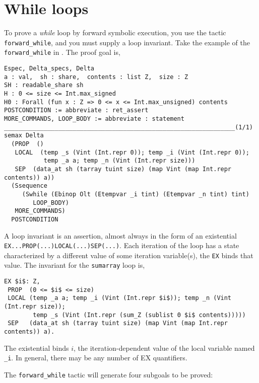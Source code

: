 \documentclass[12pt,fleqn,openany,oneside,showtrims]{memoir}
\begin{document}
\chapter{While loops}
\label{refcard:forward-while}
To prove a \emph{while} loop by forward symbolic execution,
you use the tactic \lstinline{forward_while}, and you
must supply a loop invariant.  Take the example
of the \lstinline{forward_while} in
.  The proof goal is,
\begin{lstlisting}
Espec, Delta_specs, Delta
a : val,  sh : share,  contents : list Z,  size : Z
SH : readable_share sh
H : 0 <= size <= Int.max_signed
H0 : Forall (fun x : Z => 0 <= x <= Int.max_unsigned) contents
POSTCONDITION := abbreviate : ret_assert
MORE_COMMANDS, LOOP_BODY := abbreviate : statement
________________________________________________________________(1/1)
semax Delta
  (PROP  ()
   LOCAL  (temp _s (Vint (Int.repr 0)); temp _i (Vint (Int.repr 0));
           temp _a a; temp _n (Vint (Int.repr size)))
   SEP  (data_at sh (tarray tuint size) (map Vint (map Int.repr contents)) a))
  (Ssequence
     (Swhile (Ebinop Olt (Etempvar _i tint) (Etempvar _n tint) tint)
        LOOP_BODY)
   MORE_COMMANDS)
  POSTCONDITION
\end{lstlisting}

A loop invariant is an assertion, almost always in the form
of an existential \lstinline{EX...PROP(...)LOCAL(...)SEP(...)}.
Each iteration of the loop has a state characterized by
a different value of some iteration variable(s),
the \lstinline{EX} binds that value.
The invariant for the \lstinline{sumarray} loop is,
\begin{lstlisting}
EX $i$: Z,
 PROP  (0 <= $i$ <= size)
 LOCAL (temp _a a; temp _i (Vint (Int.repr $i$)); temp _n (Vint (Int.repr size));
        temp _s (Vint (Int.repr (sum_Z (sublist 0 $i$ contents)))))
 SEP   (data_at sh (tarray tuint size) (map Vint (map Int.repr contents)) a).
\end{lstlisting}
The existential binds $i$, the iteration-dependent value
of the local variable named \lstinline{_i}.
In general, there may be any number of EX quantifiers.

The \lstinline{forward_while} tactic will generate four subgoals to be proved:
\end{document}
